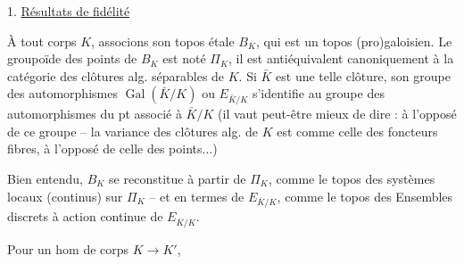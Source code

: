 1. \uline{Résultats de fidélité}

À tout corps $K$, associons son topos étale $B_K$, qui est un topos (pro)galoisien. Le groupoïde des points de $B_K$ est noté $\Pi_K$, il est antiéquivalent canoniquement à la catégorie des clôtures alg. séparables de $K$. Si $\bar K$ est une telle clôture, son groupe des automorphismes $\operatorname{Gal}(\bar K/K)$ ou $E_{\bar K/K}$ s'identifie au groupe des automorphismes du pt  associé à $\bar K/K$ (il vaut peut-être mieux de dire : à l'opposé de ce groupe --  la variance des clôtures alg. de $K$ est comme celle des foncteurs fibres, à l'opposé de celle des points...)

Bien entendu, $B_K$ se reconstitue à partir de $\Pi_K$, comme le topos des systèmes locaux (continus) sur $\Pi_K$ -- et en termes de $E_{\bar K/K}$, comme le topos des Ensembles discrets à action continue de $E_{\bar K/K}$.

Pour un hom de corps $K\longrightarrow K'$,
